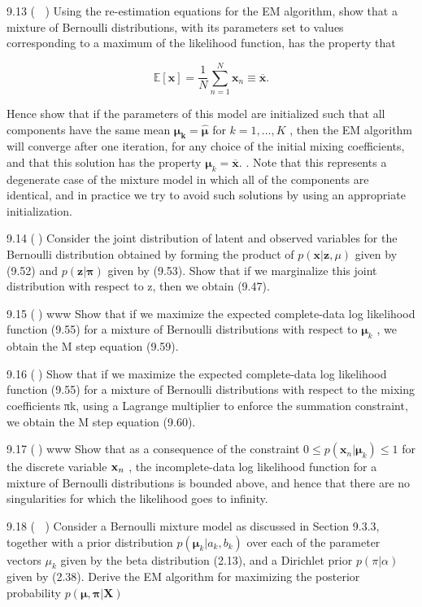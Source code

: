 \documentclass[
  10
]{article}
\begin{document}
9.13 ( ) Using the re-estimation equations for the EM algorithm, show
that a mixture of Bernoulli distributions, with its parameters set to
values corresponding to a maximum of the likelihood function, has the
property that

\[
\mathbb {E} [ \mathbf {x} ] = \frac {1}{N} \sum_ {n = 1} ^ {N} \mathbf {x} _ {n} \equiv \overline {{\mathbf {x}}}.\tag{9.83}
\]

Hence show that if the parameters of this model are initialized such
that all components have the same mean
\(\boldsymbol { \mu _ { k } } = \boldsymbol { \widehat { \mu } }\) for
\(k = 1 , \ldots , K\) , then the EM algorithm will converge after one
iteration, for any choice of the initial mixing coefficients, and that
this solution has the property
\(\pmb { \mu } _ { k } = \overline { { \mathbf { x } } } .\) . Note that
this represents a degenerate case of the mixture model in which all of
the components are identical, and in practice we try to avoid such
solutions by using an appropriate initialization.

9.14 () Consider the joint distribution of latent and observed variables
for the Bernoulli distribution obtained by forming the product of
\(p ( \mathbf { x } | \mathbf { z } , \mu )\) given by (9.52) and
\(p ( \mathbf { z } | \boldsymbol { \pi } )\) given by (9.53). Show that
if we marginalize this joint distribution with respect to z, then we
obtain (9.47).

9.15 () www Show that if we maximize the expected complete-data log
likelihood function (9.55) for a mixture of Bernoulli distributions with
respect to \(\pmb { \mu } _ { k }\) , we obtain the M step equation
(9.59).

9.16 () Show that if we maximize the expected complete-data log
likelihood function (9.55) for a mixture of Bernoulli distributions with
respect to the mixing coefficients πk, using a Lagrange multiplier to
enforce the summation constraint, we obtain the M step equation (9.60).

9.17 () www Show that as a consequence of the constraint
\(0 \leqslant p ( \mathbf x _ { n } | \pmb \mu _ { k } ) \leqslant 1\)
for the discrete variable \({ \bf x } _ { n }\) , the incomplete-data
log likelihood function for a mixture of Bernoulli distributions is
bounded above, and hence that there are no singularities for which the
likelihood goes to infinity.

9.18 ( ) Consider a Bernoulli mixture model as discussed in Section
9.3.3, together with a prior distribution
\(p ( \pmb { \mu } _ { k } | a _ { k } , b _ { k } )\) over each of the
parameter vectors \(\mu _ { k }\) given by the beta distribution (2.13),
and a Dirichlet prior \(p ( \pi \vert \alpha )\) given by (2.38). Derive
the EM algorithm for maximizing the posterior probability
\(p ( { \boldsymbol { \mu } } , { \boldsymbol { \pi } } | \mathbf { X } )\)
\end{document}
